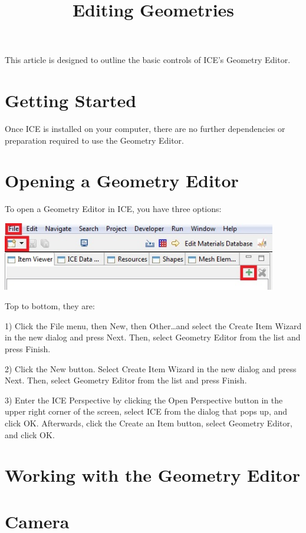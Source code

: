 \documentclass{article}
\begin{document}
 
\title{Editing Geometries}

This article is designed to outline the basic controls of ICE's Geometry Editor.

\section{Getting Started}

Once ICE is installed on your computer, there are no further dependencies or
preparation required to use the Geometry Editor.

\section{Opening a Geometry Editor}

To open a Geometry Editor in ICE, you have three options:

\begin{center}
\includegraphics[width=12cm]{images/CreateNewGeometryOptions.jpg}
\end{center}

Top to bottom, they are:

1) Click the File menu, then New, then Other\ldots and select the Create Item
Wizard in the new dialog and press Next. Then, select Geometry Editor from the
list and press Finish.

 
2) Click the New button. Select Create Item Wizard in the new dialog and
press Next. Then, select Geometry Editor from the list and press Finish.


3) Enter the ICE Perspective by clicking the Open Perspective button in the
upper right corner of the screen, select ICE from the dialog that pops up, and
click OK. Afterwards, click the Create an Item button, select Geometry Editor,
and click OK.

\section{Working with the Geometry Editor}

\section{Camera}
\end{document}
